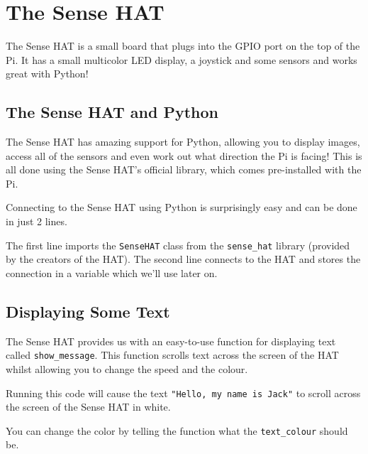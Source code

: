 \section{The Sense HAT}
	The Sense HAT is a small board that plugs into the GPIO port on the top of the Pi. It has a small multicolor LED display, a joystick and some sensors and works great with Python!

	\subsection{The Sense HAT and Python}

		The Sense HAT has amazing support for Python, allowing you to display images, access all of the sensors and even work out what direction the Pi is facing! This is all done using the Sense HAT's official library, which comes pre-installed with the Pi.

		Connecting to the Sense HAT using Python is surprisingly easy and can be done in just 2 lines.

		

		The first line imports the \texttt{SenseHAT} class from the \texttt{sense\_hat} library (provided by the creators of the HAT). The second line connects to the HAT and stores the connection in a variable which we'll use later on.

	\subsection{Displaying Some Text}

		The Sense HAT provides us with an easy-to-use function for displaying text called \texttt{show\_message}. This function scrolls text across the screen of the HAT whilst allowing you to change the speed and the colour.

		

		Running this code will cause the text \texttt{"Hello, my name is Jack"} to scroll across the screen of the Sense HAT in white.

		\webclearpage

		You can change the color by telling the function what the \texttt{text\_colour} should be.

		


